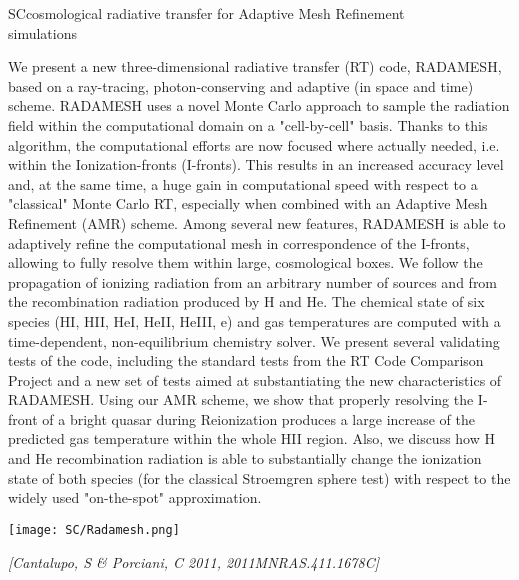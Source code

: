 \begin{section}{SC}{cosmological radiative transfer for Adaptive Mesh
    Refinement\\ simulations}
  \begin{minipage}[l]{\textwidth}

    {\small We present a new three-dimensional radiative transfer (RT) code,
      RADAMESH, based on a ray-tracing, photon-conserving and adaptive (in space
      and time) scheme. RADAMESH uses a novel Monte Carlo approach to sample the
      radiation field within the computational domain on a "cell-by-cell" basis.
      Thanks to this algorithm, the computational efforts are now focused where
      actually needed, i.e. within the Ionization-fronts (I-fronts). This
      results in an increased accuracy level and, at the same time, a huge gain
      in computational speed with respect to a "classical" Monte Carlo RT,
      especially when combined with an Adaptive Mesh Refinement (AMR) scheme.
      Among several new features, RADAMESH is able to adaptively refine the
      computational mesh in correspondence of the I-fronts, allowing to fully
      resolve them within large, cosmological boxes. We follow the propagation
      of ionizing radiation from an arbitrary number of sources and from the
      recombination radiation produced by H and He. The chemical state of six
      species (HI, HII, HeI, HeII, HeIII, e) and gas temperatures are computed
      with a time-dependent, non-equilibrium chemistry solver. We present
      several validating tests of the code, including the standard tests from
      the RT Code Comparison Project and a new set of tests aimed at
      substantiating the new characteristics of RADAMESH. Using our AMR scheme,
      we show that properly resolving the I-front of a bright quasar during
      Reionization produces a large increase of the predicted gas temperature
      within the whole HII region. Also, we discuss how H and He recombination
      radiation is able to substantially change the ionization state of both
      species (for the classical Stroemgren sphere test) with respect to the
      widely used "on-the-spot" approximation.}
  \end{minipage}

  \vspace{0.5cm}

  \begin{minipage}{\linewidth}
    \begin{center}
      \texttt{[image: SC/Radamesh.png]}
    \end{center}
  \end{minipage}

  \vspace{0.5cm}

  {\footnotesize \textit{[Cantalupo, S \& Porciani, C 2011, 2011MNRAS.411.1678C]}}
\end{section}